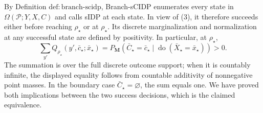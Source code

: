 By Definition \(\mathrm{def{:}branch\text{-}scidp}\), Branch-sCIDP enumerates every state in \(\Omega(\mathcal P;Y,X,C)\) and calls sIDP at each state.  In view of (3), it therefore succeeds either before reaching \(\rho_\star\) or at \(\rho_\star\).  Its discrete marginalization and normalization at any successful state are defined by positivity.  In particular, at \(\rho_\star\),
\[
 \sum_{y'}Q_{\rho_\star}(y',\bar c_\star;\bar x_\star)
 =P_{\mathbf M}(\bar C_\star=\bar c_\star
       \mid\operatorname{do}(\bar X_\star=\bar x_\star))>0.
\]
The summation is over the full discrete outcome support; when it is countably infinite, the displayed equality follows from countable additivity of nonnegative point masses.  In the boundary case \(\bar C_\star=\varnothing\), the sum equals one.  We have proved both implications between the two success decisions, which is the claimed equivalence.
